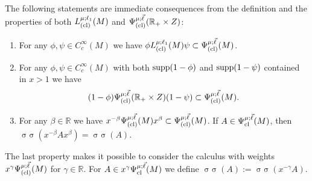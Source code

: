 \documentclass[reqno]{amsart}
\numberwithin{equation}{section}
\theoremstyle{definition}
\def\R{\mathbb R}
\DeclareMathOperator{\sym}{ \sigma\!\!\!\sigma}
\begin{document}
The following statements are immediate consequences from the definition and the properties of both $L^{\mu;\ell_1}_{\textup{(cl)}}(M)$ and $\Psi^{\mu;\vec{\ell}}_{\textup{(cl)}}(\R_+\times Z)$:

\begin{enumerate}
\item For any $\phi,\psi \in C_c^{\infty}(M)$ we have $\phi L^{\mu;\ell_1}_{\textup{(cl)}}(M) \psi \subset \Psi^{\mu;\vec{\ell}}_{\textup{(cl)}}(M)$.
\item For any $\phi,\psi \in C_c^{\infty}(M)$ with both $\textup{supp}(1-\phi)$ and $\textup{supp}(1-\psi)$ contained in $x > 1$ we have
$$
(1-\phi) \Psi^{\mu;\vec{\ell}}_{\textup{(cl)}}(\R_+\times Z)(1-\psi) \subset \Psi^{\mu;\vec{\ell}}_{\textup{(cl)}}(M).
$$
\item For any $\beta \in \R$ we have $x^{-\beta} \Psi^{\mu;\vec{\ell}}_{\textup{(cl)}}(M) x^{\beta} \subset \Psi^{\mu;\vec{\ell}}_{\textup{(cl)}}(M)$. If $A \in \Psi^{\mu;\vec{\ell}}_{\textup{cl}}(M)$, then  $\sym(x^{-\beta}Ax^{\beta}) = \sym(A)$.
\end{enumerate}

\noindent
The last property makes it possible to consider the calculus with weights $x^{\gamma} \Psi^{\mu;\vec{\ell}}_{\textup{(cl)}}(M)$ for $\gamma \in \R$. For $A \in x^{\gamma} \Psi^{\mu;\vec{\ell}}_{\textup{cl}}(M)$ we define $\sym(A):= \sym(x^{-\gamma}A)$.
\end{document}
